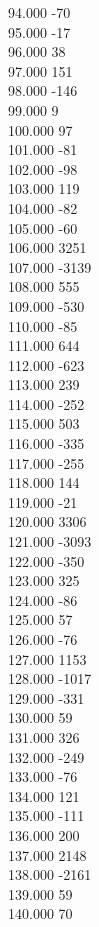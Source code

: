 { 94.000	-70 \\
 95.000	-17 \\
 96.000	38 \\
 97.000	151 \\
 98.000	-146 \\
 99.000	9 \\
 100.000	97 \\
 101.000	-81 \\
 102.000	-98 \\
 103.000	119 \\
 104.000	-82 \\
 105.000	-60 \\
 106.000	3251 \\
 107.000	-3139 \\
 108.000	555 \\
 109.000	-530 \\
 110.000	-85 \\
 111.000	644 \\
 112.000	-623 \\
 113.000	239 \\
 114.000	-252 \\
 115.000	503 \\
 116.000	-335 \\
 117.000	-255 \\
 118.000	144 \\
 119.000	-21 \\
 120.000	3306 \\
 121.000	-3093 \\
 122.000	-350 \\
 123.000	325 \\
 124.000	-86 \\
 125.000	57 \\
 126.000	-76 \\
 127.000	1153 \\
 128.000	-1017 \\
 129.000	-331 \\
 130.000	59 \\
 131.000	326 \\
 132.000	-249 \\
 133.000	-76 \\
 134.000	121 \\
 135.000	-111 \\
 136.000	200 \\
 137.000	2148 \\
 138.000	-2161 \\
 139.000	59 \\
 140.000	70 \\
}
